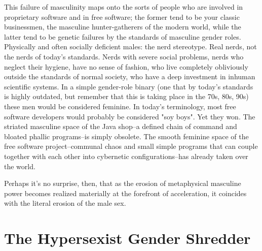 \documentclass[12pt, a5paper, twoside, openright]{memoir}
\begin{document}
This failure of masculinity maps onto the sorts of people who are involved in proprietary software and in free software; the former tend to be your classic businessmen, the masculine hunter-gatherers of the modern world, while the latter tend to be genetic failures by the standards of masculine gender roles. Physically and often socially deficient males: the nerd stereotype. Real nerds, not the nerds of today's standards. Nerds with severe social problems, nerds who neglect their hygiene, have no sense of fashion, who live completely obliviously outside the standards of normal society, who have a deep investment in inhuman scientific systems. In a simple gender-role binary (one that by today's standards is highly outdated, but remember that this is taking place in the 70s, 80s, 90s) these men would be considered feminine. In today's terminology, most free software developers would probably be considered "soy boys". Yet they won. The striated masculine space of the Java shop--a defined chain of command and bloated phallic programs--is simply obsolete. The smooth feminine space of the free software project--communal chaos and small simple programs that can couple together with each other into cybernetic configurations--has already taken over the world.

Perhaps it's no surprise, then, that as the erosion of metaphysical masculine power becomes realized materially at the forefront of acceleration, it coincides with the literal erosion of the male sex.

\chapter{The Hypersexist Gender Shredder}
\end{document}
